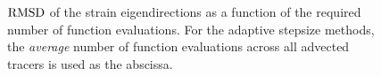 \begin{figure}[htpb]
    \centering
    
    \caption[$\rmsd$ of the strain eigendirections as a function of the required
    number of function evaluations]{
    $\rmsd$ of the strain eigendirections as a function of the required number
    of function evaluations. For the adaptive stepsize methods, the
    \emph{average} number of function evaluations across all advected tracers
    is used as the abscissa.}
    \label{fig:xi2_err_both}
\end{figure}
